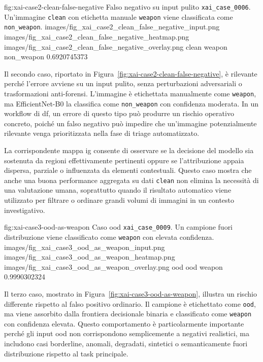 \XAIcaseFigure
{fig:xai-case2-clean-false-negative}
{Falso negativo su input pulito \texttt{xai\_case\_0006}. Un'immagine \texttt{clean} con etichetta manuale \texttt{weapon} viene classificata come \texttt{non\_weapon}.}
{images/fig_xai_case2_clean_false_negative_input.png}
{images/fig_xai_case2_clean_false_negative_heatmap.png}
{images/fig_xai_case2_clean_false_negative_overlay.png}
{clean}
{weapon}
{non\_weapon}
{0.6920745373}

Il secondo caso, riportato in Figura~\ref{fig:xai-case2-clean-false-negative},
è rilevante perché l'errore avviene su un input pulito, senza perturbazioni
adversariali o trasformazioni anti-forensi. L'immagine è etichettata manualmente
come \texttt{weapon}, ma EfficientNet-B0 la classifica come \texttt{non\_weapon}
con confidenza moderata. In un workflow di \gls{df}, un errore di questo tipo
può produrre un rischio operativo concreto, poiché un falso negativo può impedire
che un'immagine potenzialmente rilevante venga prioritizzata nella fase di triage
automatizzato.

La corrispondente mappa \gls{ig} consente di osservare se la decisione del
modello sia sostenuta da regioni effettivamente pertinenti oppure se
l'attribuzione appaia dispersa, parziale o influenzata da elementi contestuali.
Questo caso mostra che anche una buona performance aggregata su dati
\texttt{clean} non elimina la necessità di una valutazione umana, soprattutto
quando il risultato automatico viene utilizzato per filtrare o ordinare grandi
volumi di immagini in un contesto investigativo.

\XAIcaseFigure
{fig:xai-case3-ood-as-weapon}
{Caso \gls{ood} \texttt{xai\_case\_0009}. Un campione fuori distribuzione viene classificato come \texttt{weapon} con elevata confidenza.}
{images/fig_xai_case3_ood_as_weapon_input.png}
{images/fig_xai_case3_ood_as_weapon_heatmap.png}
{images/fig_xai_case3_ood_as_weapon_overlay.png}
{ood}
{ood}
{weapon}
{0.9990302324}

Il terzo caso, mostrato in Figura~\ref{fig:xai-case3-ood-as-weapon}, illustra
un rischio differente rispetto al falso positivo ordinario. Il campione è
etichettato come \texttt{ood}, ma viene assorbito dalla frontiera decisionale
binaria e classificato come \texttt{weapon} con confidenza elevata. Questo
comportamento è particolarmente importante perché gli input \gls{ood} non
corrispondono semplicemente a negativi realistici, ma includono casi borderline,
anomali, degradati, sintetici o semanticamente fuori distribuzione rispetto al
task principale.

